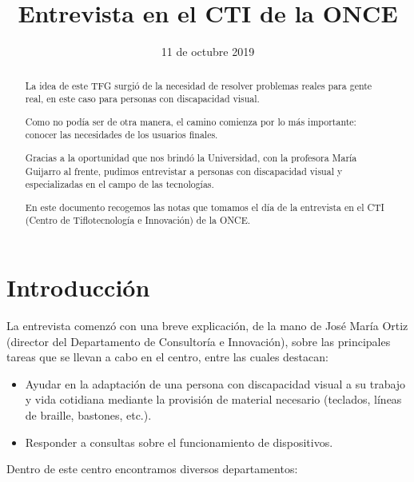 \documentclass{article}
\title{\Huge Entrevista en el CTI de la ONCE}
\date{11 de octubre 2019}
\begin{document}
	
	\begin{titlepage}
		\maketitle
		\thispagestyle{empty}
	\end{titlepage}
	
	\begin{abstract}
		La idea de este TFG surgió de la necesidad de resolver problemas reales para gente real, en este caso para personas con discapacidad visual.
		
		Como no podía ser de otra manera, el camino comienza por lo más importante: conocer las necesidades de los usuarios finales.
		
		Gracias a la oportunidad que nos  brindó la Universidad, con la profesora María Guijarro al frente, pudimos entrevistar a personas con discapacidad visual y especializadas en el campo de las tecnologías.
		
		En este documento recogemos las notas que tomamos el día de la entrevista en el CTI (Centro de Tiflotecnología e Innovación) de la ONCE.
		
	\end{abstract}
	
	\section{Introducción}
		La entrevista comenzó con una breve explicación, de la mano de José María Ortiz (director del Departamento de Consultoría e Innovación), sobre las principales tareas que se llevan a cabo en el centro, entre las cuales destacan:
	
	 \begin{itemize}
		\item Ayudar en la adaptación  de una persona con discapacidad visual a su trabajo y vida cotidiana mediante la provisión de material necesario (teclados, líneas de braille, bastones, etc.).
		\item Responder a consultas sobre el funcionamiento de dispositivos.
	\end{itemize}
	
	Dentro de este centro encontramos diversos departamentos:
	
\end{document}
